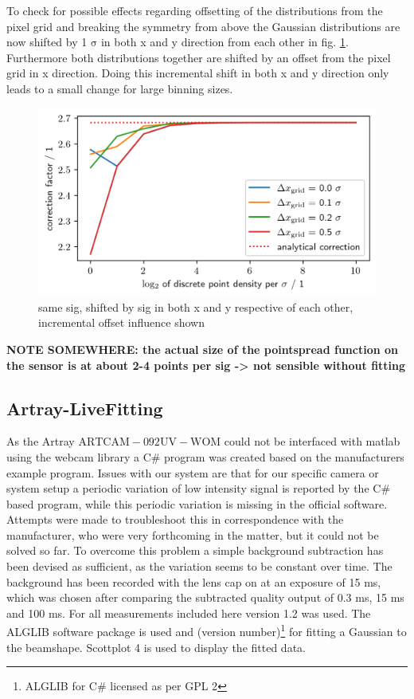 \documentclass[twoside,openright]{scrreprt}
\begin{document}
To check for possible effects regarding offsetting of the distributions from the pixel grid and breaking the symmetry from above the Gaussian distributions are now shifted by 1 $\mathrm{\sigma}$ in both x and y direction from each other in fig. \ref{fig:NumericalCorrectionShift}. Furthermore both distributions together are shifted by an offset from the pixel grid in x direction. Doing this incremental shift in both x and y direction only leads to a small change for large binning sizes. 

\begin{figure}[h]
\centering
\includegraphics[width=0.9\linewidth]{images/NumericalCorrectionShiftedBeams.png}
\caption{same sig, shifted by sig in both x and y respective of each other, incremental offset influence shown\label{fig:NumericalCorrectionShift}}
\end{figure}
\textbf{NOTE SOMEWHERE: the actual size of the pointspread function on the sensor is at about 2-4 points per sig -> not sensible without fitting}

\subsection{Artray-LiveFitting}\label{Sec:LiveFitting}
As the Artray $\mathrm{ARTCAM-092UV-WOM}$ could not be interfaced with matlab using the webcam library a C\# program was created based on the manufacturers example program.
Issues with our system are that for our specific camera or system setup a periodic variation of low intensity signal is reported by the C\# based program, while this periodic variation is missing in the official software. Attempts were made to troubleshoot this in correspondence with the manufacturer, who were very forthcoming in the matter, but it could not be solved so far. To overcome this problem a simple background subtraction has been devised as sufficient, as the variation seems to be constant over time. The background has been recorded with the lens cap on at an exposure of 15 ms, which was chosen after comparing the subtracted quality output of 0.3 ms, 15 ms and 100 ms. 
\newline
For all measurements included here version 1.2 was used. The  ALGLIB software package is used and (version number)\footnote{ALGLIB for C\# licensed as per GPL 2} for fitting a Gaussian to the beamshape. Scottplot 4 is used to display the fitted data.\\
\end{document}
